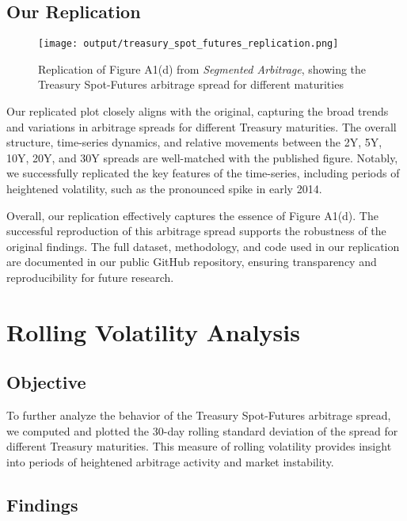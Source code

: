 \documentclass{article}
\begin{document}
\subsection{Our Replication}

\begin{figure}[h]
  \centering
  \texttt{[image: output/treasury\_spot\_futures\_replication.png]}
  \caption{Replication of Figure A1(d) from \textit{Segmented Arbitrage}, showing the Treasury Spot-Futures arbitrage spread for different maturities}
  \label{fig:treasury_spot_futures_replication}
\end{figure}




Our replicated plot closely aligns with the original, capturing the broad trends and variations in arbitrage spreads for different Treasury maturities. The overall structure, time-series dynamics, and relative movements between the 2Y, 5Y, 10Y, 20Y, and 30Y spreads are well-matched with the published figure. Notably, we successfully replicated the key features of the time-series, including periods of heightened volatility, such as the pronounced spike in early 2014.

Overall, our replication effectively captures the essence of Figure A1(d). The successful reproduction of this arbitrage spread supports the robustness of the original findings. The full dataset, methodology, and code used in our replication are documented in our public GitHub repository, ensuring transparency and reproducibility for future research.


\newpage


\section{Rolling Volatility Analysis}
\subsection{Objective}

To further analyze the behavior of the Treasury Spot-Futures arbitrage spread, we computed and plotted the 30-day rolling standard deviation of the spread for different Treasury maturities. This measure of rolling volatility provides insight into periods of heightened arbitrage activity and market instability.

\subsection{Findings}
\end{document}
